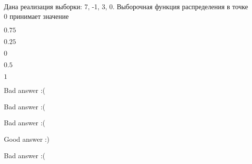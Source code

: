 
\begin{question}
Дана реализация выборки: 7, -1, 3, 0. Выборочная функция распределения в
точке 0 принимает значение
\begin{answerlist}
  \item \(0.75\)
  \item \(0.25\)
  \item \(0\)
  \item \(0.5\)
  \item \(1\)
\end{answerlist}
\end{question}

\begin{solution}
\begin{answerlist}
  \item Bad answer :(
  \item Bad answer :(
  \item Bad answer :(
  \item Good answer :)
  \item Bad answer :(
\end{answerlist}
\end{solution}

